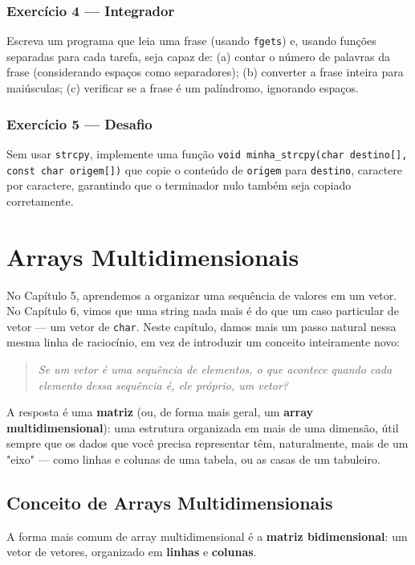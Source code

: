 \documentclass[12pt,a4paper,oneside]{extreport}
\begin{document}
\subsection*{Exercício 4 --- Integrador}
Escreva um programa que leia uma frase (usando \texttt{fgets}) e, usando funções separadas para cada tarefa, seja capaz de: (a) contar o número de palavras da frase (considerando espaços como separadores); (b) converter a frase inteira para maiúsculas; (c) verificar se a frase é um palíndromo, ignorando espaços.

\subsection*{Exercício 5 --- Desafio}
Sem usar \texttt{strcpy}, implemente uma função \texttt{void minha\_strcpy(char destino[], const char origem[])} que copie o conteúdo de \texttt{origem} para \texttt{destino}, caractere por caractere, garantindo que o terminador nulo também seja copiado corretamente.


\chapter{Arrays Multidimensionais}

No Capítulo 5, aprendemos a organizar uma sequência de valores em um vetor. No Capítulo 6, vimos que uma string nada mais é do que um caso particular de vetor — um vetor de \texttt{char}. Neste capítulo, damos mais um passo natural nessa mesma linha de raciocínio, em vez de introduzir um conceito inteiramente novo:

\begin{quote}
\textit{Se um vetor é uma sequência de elementos, o que acontece quando cada elemento dessa sequência é, ele próprio, um vetor?}
\end{quote}

A resposta é uma \textbf{matriz} (ou, de forma mais geral, um \textbf{array multidimensional}): uma estrutura organizada em mais de uma dimensão, útil sempre que os dados que você precisa representar têm, naturalmente, mais de um "eixo" — como linhas e colunas de uma tabela, ou as casas de um tabuleiro.

\section{Conceito de Arrays Multidimensionais}

A forma mais comum de array multidimensional é a \textbf{matriz bidimensional}: um vetor de vetores, organizado em \textbf{linhas} e \textbf{colunas}.
\end{document}
